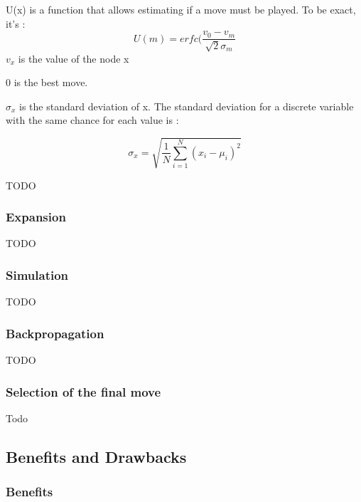 U(x) is a function that allows estimating if a move must be played. To be exact, it's : 
$$
U(m) = erfc(\frac{v_0 -v_m}{\sqrt{2}\sigma_m}
$$
$v_x$ is the value of the node x

0 is the best move. 

$\sigma_x$ is the standard deviation of x. The standard deviation for a discrete variable with the same chance for each value is : 

$$ 
\sigma_x 	= \sqrt{\frac{1}{N} \sum\limits_{i=1}^{N} (x_i-\mu_i)^2}
$$

TODO

\subsubsection{Expansion}
TODO
\subsubsection{Simulation}
TODO
\subsubsection{Backpropagation}
TODO

\subsubsection{Selection of the final move}
Todo

\subsection{Benefits and Drawbacks}

\subsubsection{Benefits}


